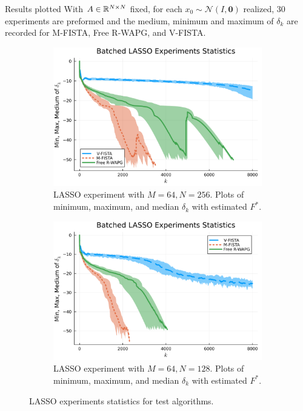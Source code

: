 \documentclass[11pt]{beamer}
\theoremstyle{definition}
\begin{document}
        \begin{frame}{Results plotted}
            With $A\in \mathbb R^{N\times N}$ fixed, for each $x_0 \sim \mathcal N(I, \mathbf 0)$ realized, 30 experiments are preformed and the medium, minimum and maximum of $\delta_k$ are recorded for M-FISTA, Free R-WAPG, and V-FISTA. 
            \begin{figure}[H]
                \begin{subfigure}[b]{0.47\textwidth}
                    \centering
                    \includegraphics[width=\textwidth]{assets/lasso_batched_statistics_64-256.png}
                    \caption{LASSO experiment with $M = 64, N = 256$. Plots of minimum, maximum, and median $\delta_k$ with estimated $F^*$. }
                \end{subfigure}
                \begin{subfigure}[b]{0.47\textwidth}
                    \centering
                    \includegraphics[width=\textwidth]{assets/lasso_batched_statistics_64-128.png}
                    \caption{LASSO experiment with $M = 64, N = 128$. Plots of minimum, maximum, and median $\delta_k$ with estimated $F^*$. }
                \end{subfigure}
                \caption{LASSO experiments statistics for test algorithms. }
                \label{fig:batched-lasso}
            \end{figure}
        \end{frame}
\end{document}
